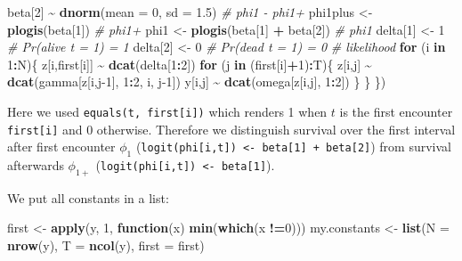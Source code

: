 \documentclass[
  12pt,
]{krantz}
\newenvironment{Shaded}{\begin{snugshade}}{\end{snugshade}}
\newcommand{\AttributeTok}[1]{\textcolor[rgb]{0.13,0.29,0.53}{#1}}
\newcommand{\CommentTok}[1]{\textcolor[rgb]{0.56,0.35,0.01}{\textit{#1}}}
\newcommand{\ControlFlowTok}[1]{\textcolor[rgb]{0.13,0.29,0.53}{\textbf{#1}}}
\newcommand{\DecValTok}[1]{\textcolor[rgb]{0.00,0.00,0.81}{#1}}
\newcommand{\FloatTok}[1]{\textcolor[rgb]{0.00,0.00,0.81}{#1}}
\newcommand{\FunctionTok}[1]{\textcolor[rgb]{0.13,0.29,0.53}{\textbf{#1}}}
\newcommand{\NormalTok}[1]{#1}
\newcommand{\OtherTok}[1]{\textcolor[rgb]{0.56,0.35,0.01}{#1}}
\newcommand{\SpecialCharTok}[1]{\textcolor[rgb]{0.81,0.36,0.00}{\textbf{#1}}}
\begin{document}
\begin{Shaded}
\begin{Highlighting}[]
\NormalTok{  beta[}\DecValTok{2}\NormalTok{] }\SpecialCharTok{\textasciitilde{}} \FunctionTok{dnorm}\NormalTok{(}\AttributeTok{mean =} \DecValTok{0}\NormalTok{, }\AttributeTok{sd =} \FloatTok{1.5}\NormalTok{) }\CommentTok{\# phi1 {-} phi1+}
\NormalTok{  phi1plus }\OtherTok{\textless{}{-}} \FunctionTok{plogis}\NormalTok{(beta[}\DecValTok{1}\NormalTok{])         }\CommentTok{\# phi1+}
\NormalTok{  phi1 }\OtherTok{\textless{}{-}} \FunctionTok{plogis}\NormalTok{(beta[}\DecValTok{1}\NormalTok{] }\SpecialCharTok{+}\NormalTok{ beta[}\DecValTok{2}\NormalTok{])   }\CommentTok{\# phi1}
\NormalTok{  delta[}\DecValTok{1}\NormalTok{] }\OtherTok{\textless{}{-}} \DecValTok{1}          \CommentTok{\# Pr(alive t = 1) = 1}
\NormalTok{  delta[}\DecValTok{2}\NormalTok{] }\OtherTok{\textless{}{-}} \DecValTok{0}          \CommentTok{\# Pr(dead t = 1) = 0}
  \CommentTok{\# likelihood}
  \ControlFlowTok{for}\NormalTok{ (i }\ControlFlowTok{in} \DecValTok{1}\SpecialCharTok{:}\NormalTok{N)\{}
\NormalTok{    z[i,first[i]] }\SpecialCharTok{\textasciitilde{}} \FunctionTok{dcat}\NormalTok{(delta[}\DecValTok{1}\SpecialCharTok{:}\DecValTok{2}\NormalTok{])}
    \ControlFlowTok{for}\NormalTok{ (j }\ControlFlowTok{in}\NormalTok{ (first[i]}\SpecialCharTok{+}\DecValTok{1}\NormalTok{)}\SpecialCharTok{:}\NormalTok{T)\{}
\NormalTok{      z[i,j] }\SpecialCharTok{\textasciitilde{}} \FunctionTok{dcat}\NormalTok{(gamma[z[i,j}\DecValTok{{-}1}\NormalTok{], }\DecValTok{1}\SpecialCharTok{:}\DecValTok{2}\NormalTok{, i, j}\DecValTok{{-}1}\NormalTok{])}
\NormalTok{      y[i,j] }\SpecialCharTok{\textasciitilde{}} \FunctionTok{dcat}\NormalTok{(omega[z[i,j], }\DecValTok{1}\SpecialCharTok{:}\DecValTok{2}\NormalTok{])}
\NormalTok{    \}}
\NormalTok{  \}}
\NormalTok{\})}
\end{Highlighting}
\end{Shaded}

Here we used \texttt{equals(t,\ first{[}i{]})} which renders 1 when \(t\) is the first encounter \texttt{first{[}i{]}} and 0 otherwise. Therefore we distinguish survival over the first interval after first encounter \(\phi_1\) (\texttt{logit(phi{[}i,t{]})\ \textless{}-\ beta{[}1{]}\ +\ beta{[}2{]}}) from survival afterwards \(\phi_{1+}\) (\texttt{logit(phi{[}i,t{]})\ \textless{}-\ beta{[}1{]}}).

We put all constants in a list:

\begin{Shaded}
\begin{Highlighting}[]
\NormalTok{first }\OtherTok{\textless{}{-}} \FunctionTok{apply}\NormalTok{(y, }\DecValTok{1}\NormalTok{, }\ControlFlowTok{function}\NormalTok{(x) }\FunctionTok{min}\NormalTok{(}\FunctionTok{which}\NormalTok{(x }\SpecialCharTok{!=}\DecValTok{0}\NormalTok{)))}
\NormalTok{my.constants }\OtherTok{\textless{}{-}} \FunctionTok{list}\NormalTok{(}\AttributeTok{N =} \FunctionTok{nrow}\NormalTok{(y), }
                     \AttributeTok{T =} \FunctionTok{ncol}\NormalTok{(y), }
                     \AttributeTok{first =}\NormalTok{ first)}
\end{Highlighting}
\end{Shaded}
\end{document}
